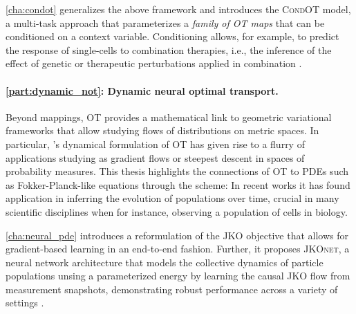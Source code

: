 \cref{cha:condot} generalizes the above framework and introduces the \textsc{CondOT} model, a multi-task approach that parameterizes a \emph{family of OT maps} that can be conditioned on a context variable. Conditioning allows, for example, to predict the response of single-cells to combination therapies, i.e., the inference of the effect of genetic or therapeutic perturbations applied in combination \citep{bunne2022supervised}. \\
	


\paragraph{\cref{part:dynamic_not}: Dynamic neural optimal transport.}

Beyond mappings, OT provides a mathematical link to geometric variational frameworks that allow studying flows of distributions on metric spaces.
In particular, \citeauthor{brenier1987decomposition}'s dynamical formulation of OT has given rise to a flurry of applications studying  as gradient flows or steepest descent in spaces of probability measures.
This thesis highlights the connections of OT to PDEs such as Fokker-Planck-like equations through the \citeauthor*{jordan1998variational} scheme: In recent works \citep{bunne2022proximal, alvarez2021optimizing, mokrov2021large, benamou2016augmented} 
it has found application in inferring the evolution of populations over time, crucial in many scientific disciplines when for instance, observing a population of cells in biology.

\cref{cha:neural_pde} introduces a reformulation of the JKO objective that allows for gradient-based learning in an end-to-end fashion. Further, it proposes \textsc{JKOnet}, a neural network architecture that models the collective dynamics of particle populations unsing a parameterized energy by learning the causal JKO flow from measurement snapshots,
demonstrating robust performance across a variety of settings \citep{bunne2022proximal}.

